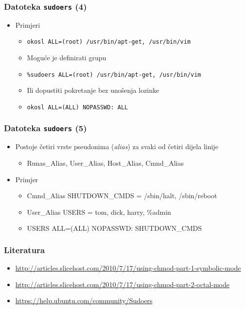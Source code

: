 \documentclass[table,usenames,dvipsnames]{beamer}
\newcommand{\shell}[1]{\texttt{#1}}
\begin{document}
\begin{frame}[t]
\frametitle{Datoteka \shell{sudoers} (4)}
\begin{itemize}
  \item Primjeri
  \begin{itemize}
    \item[]\footnotesize \shell{okosl ALL=(root) /usr/bin/apt-get, 
           /usr/bin/vim} 
    \item Moguće je definirati grupu
    \item[]\footnotesize \shell{\%sudoers ALL=(root) /usr/bin/apt-get, 
           /usr/bin/vim} 
    \item Ili dopustiti pokretanje bez unošenja lozinke
    \item[]\footnotesize \shell{okosl ALL=(ALL) NOPASSWD: ALL}
  \end{itemize}
\end{itemize}
\end{frame}

\begin{frame}[t]
\frametitle{Datoteka \shell{sudoers} (5)}
\begin{itemize}
  \item Postoje četiri vrste pseudonima (\emph{alias}) za svaki od četiri 
        dijela linije
  \begin{itemize}
    \item Runas\_Alias, User\_Alias, Host\_Alias, Cmnd\_Alias
  \end{itemize}
  \item Primjer
  \begin{itemize}
    \item[] Cmnd\_Alias SHUTDOWN\_CMDS = /sbin/halt, /sbin/reboot
    \item[] User\_Alias USERS = tom, dick, harry, \%admin
    \item[] USERS ALL=(ALL) NOPASSWD: SHUTDOWN\_CMDS
  \end{itemize}
\end{itemize}
\end{frame}

\begin{frame}[t]
\frametitle{Literatura}
\begin{itemize}
  \item \url{http://articles.slicehost.com/2010/7/17/using-chmod-part-1-symbolic-mode}
  \item \url{http://articles.slicehost.com/2010/7/17/using-chmod-part-2-octal-mode}
  \item \url{https://help.ubuntu.com/community/Sudoers}
\end{itemize}
\end{frame}
\end{document}
